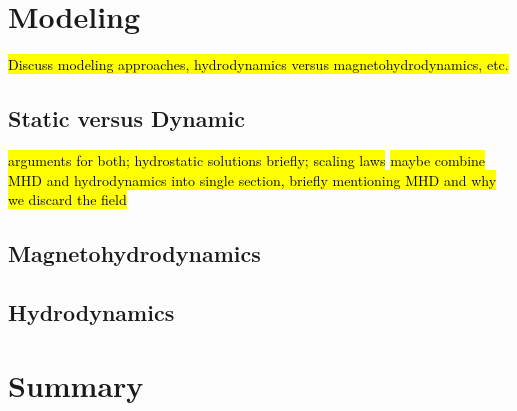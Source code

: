 \section{Modeling}
\label{sec:modeling}
%
\hl{Discuss modeling approaches, hydrodynamics versus magnetohydrodynamics, etc.}
\subsection{Static versus Dynamic}
\label{subsec:static_v_dynamic}
%
\hl{arguments for both; hydrostatic solutions briefly; scaling laws}
\hl{maybe combine MHD and hydrodynamics into single section, briefly mentioning MHD and why we discard the field}
\subsection{Magnetohydrodynamics}
\label{subsec:mhd}
%
\subsection{Hydrodynamics}
\label{subsec:hydro}
%
%
\section{Summary}
